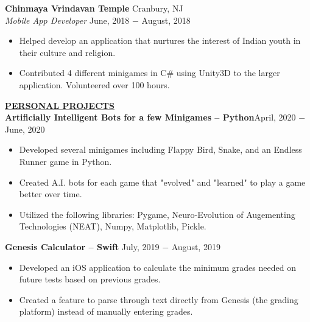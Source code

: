 \documentclass{article}
\begin{document}
\noindent \textbf{Chinmaya Vrindavan Temple} \hfill Cranbury, NJ \\
\textit{Mobile App Developer} \hfill June, 2018 $-$ August, 2018
\begin{itemize}[noitemsep,nolistsep,leftmargin=*]
\item {Helped develop an application that nurtures the interest of Indian youth in their culture and religion.}
\item {Contributed 4 different minigames in C\# using Unity3D to the larger application. Volunteered over 100 hours.}\\
\end{itemize}

%
%
\noindent \textbf{\underline{PERSONAL PROJECTS}} \\
\noindent \textbf{Artificially Intelligent Bots for a few Minigames -- Python}\hfill  April, 2020 $-$ June, 2020
\begin{itemize}[noitemsep,nolistsep,leftmargin=*]
\item {Developed several minigames including Flappy Bird, Snake, and an Endless Runner game in Python.}
\item {Created A.I. bots for each game that "evolved" and "learned" to play a game better over time.}
\item {Utilized the following libraries: Pygame, Neuro-Evolution of Augementing Technologies (NEAT), Numpy, Matplotlib, Pickle.}\\
\end{itemize}

\noindent \textbf{Genesis Calculator -- Swift} \hfill  July, 2019 $-$ August, 2019
\begin{itemize}[noitemsep,nolistsep,leftmargin=*]
\item {Developed an iOS application to calculate the minimum grades needed on future tests based on previous grades.}
\item {Created a feature to parse through text directly from Genesis (the grading platform) instead of manually entering grades.}\\
\end{itemize}
\end{document}
